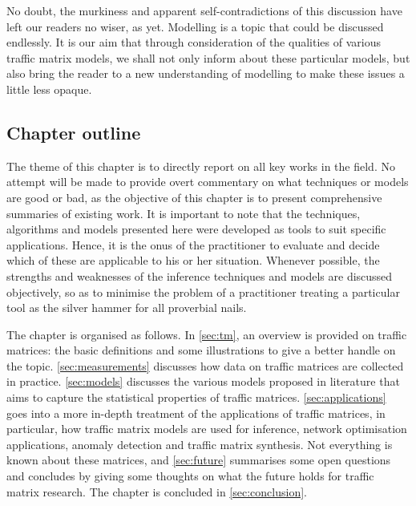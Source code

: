 No doubt, the murkiness and apparent self-contradictions of this
discussion have left our readers no wiser, as yet. Modelling is a
topic that could be discussed endlessly. It is our aim that through
consideration of the qualities of various traffic matrix models, we
shall not only inform about these particular models, but also bring
the reader to a new understanding of modelling to make these
issues a little less opaque.



\subsection{Chapter outline}

The theme of this chapter is to directly report on all key works in
the field. No attempt will be made to provide overt commentary on what
techniques or models are good or bad, as the objective of this chapter
is to present comprehensive summaries of existing work. It is
important to note that the techniques, algorithms and models presented
here were developed as tools to suit specific applications. Hence, it
is the onus of the practitioner to evaluate and decide which of these
are applicable to his or her situation. Whenever possible, the
strengths and weaknesses of the inference techniques and models are
discussed objectively, so as to minimise the problem of a practitioner
treating a particular tool as the silver hammer for all proverbial
nails.

The chapter is organised as follows. In \autoref{sec:tm}, an overview
is provided on traffic matrices: the basic definitions and some
illustrations to give a better handle on the topic.
\autoref{sec:measurements} discusses how data on traffic matrices are
collected in practice. \autoref{sec:models} discusses the various
models proposed in literature that aims to capture the statistical
properties of traffic matrices. \autoref{sec:applications} goes into a
more in-depth treatment of the applications of traffic matrices, in
particular, how traffic matrix models are used for inference, network
optimisation applications, anomaly detection and traffic matrix
synthesis. Not everything is known about these matrices, and
\autoref{sec:future} summarises some open questions 
and concludes by giving some thoughts on what the future holds for
traffic matrix research. The chapter is concluded in \autoref{sec:conclusion}.

